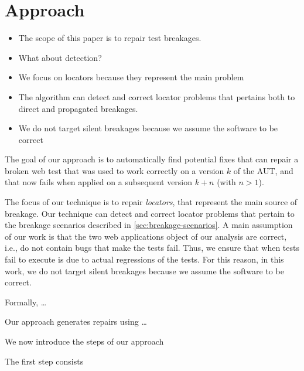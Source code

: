 \section{Approach}\label{sec:approach}

\begin{itemize}
\item The scope of this paper is to repair test breakages. 
\item What about detection?
\item We focus on locators because they represent the main problem
\item The algorithm can detect and correct locator problems that pertains both to direct and propagated breakages.
\item We do not target silent breakages because we assume the software to be correct
\end{itemize}

The goal of our approach is to automatically find potential fixes that can repair a broken web test that was used to work correctly on a  version $k$ of the AUT, and that now fails when applied on a subsequent version $k+n$ (with $n>1$).

The focus of our technique is to repair \textit{locators}, that represent the main source of breakage.
Our technique can detect and correct locator problems that pertain to the breakage scenarios described in \autoref{sec:breakage-scenarios}. A main assumption of our work is that the two web applications object of our analysis are correct, i.e., do not contain bugs that make the tests fail. Thus, we ensure that when tests fail to execute is due to actual regressions of the tests. For this reason, in this work, we do not target silent breakages because we assume the software to be correct.

Formally, \ldots 

Our approach generates repairs using \ldots

We now introduce the steps of our approach


The first step consists




